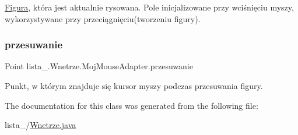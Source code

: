 \mbox{\hyperlink{interfacelista__5_1_1_figura}{Figura}}, która jest aktualnie rysowana. Pole inicjalizowane przy wciśnięciu myszy, wykorzystywane przy przeciągnięciu(tworzeniu figury). \mbox{\label{classlista__5_1_1_wnetrze_1_1_moj_mouse_adapter_a54478d4d410971228cd0821c48645193}} 
\subsubsection{\texorpdfstring{przesuwanie}{przesuwanie}}
{\footnotesize\ttfamily Point lista\+\_.\+Wnetrze.\+Moj\+Mouse\+Adapter.\+przesuwanie\hspace{0.3cm}{\ttfamily [private]}}

Punkt, w którym znajduje się kursor myszy podczas przesuwania figury. 

The documentation for this class was generated from the following file\+:\begin{DoxyCompactItemize}
\item 
lista\+\_/\mbox{\hyperlink{_wnetrze_8java}{Wnetrze.\+java}}\end{DoxyCompactItemize}
